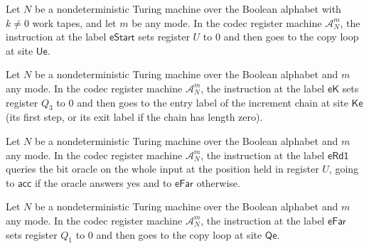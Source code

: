 \begin{lemma}
\label{Complexity.Codec.CA_eStart_of_pos}
\leanok
{}
Let $N$ be a nondeterministic Turing machine over the Boolean alphabet with $k \neq 0$
work tapes, and let $m$ be any mode. In the codec register machine $\mathcal{A}^m_N$, the
instruction at the label $\mathsf{eStart}$ sets register $U$ to $0$ and then goes to the
copy loop at site $\mathsf{Ue}$.
\end{lemma}

\begin{lemma}
\label{Complexity.Codec.CA_eK}
\leanok
{}
Let $N$ be a nondeterministic Turing machine over the Boolean alphabet and $m$ any mode.
In the codec register machine $\mathcal{A}^m_N$, the instruction at the label
$\mathsf{eK}$ sets register $Q_3$ to $0$ and then goes to the entry label of the
increment chain at site $\mathsf{Ke}$ (its first step, or its exit label if the chain has
length zero).
\end{lemma}

\begin{lemma}
\label{Complexity.Codec.CA_eRd1}
\leanok
{}
Let $N$ be a nondeterministic Turing machine over the Boolean alphabet and $m$ any mode.
In the codec register machine $\mathcal{A}^m_N$, the instruction at the label
$\mathsf{eRd1}$ queries the bit oracle on the whole input at the position held in
register $U$, going to $\mathsf{acc}$ if the oracle answers yes and to $\mathsf{eFar}$
otherwise.
\end{lemma}

\begin{lemma}
\label{Complexity.Codec.CA_eFar}
\leanok
{}
Let $N$ be a nondeterministic Turing machine over the Boolean alphabet and $m$ any mode.
In the codec register machine $\mathcal{A}^m_N$, the instruction at the label
$\mathsf{eFar}$ sets register $Q_1$ to $0$ and then goes to the copy loop at site
$\mathsf{Qe}$.
\end{lemma}

